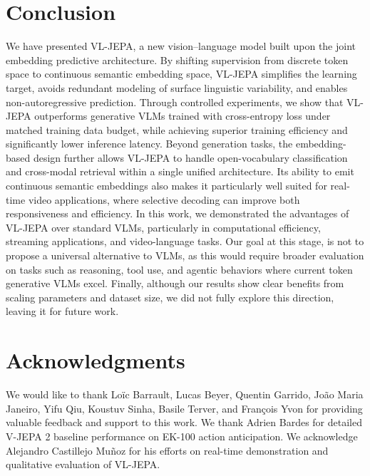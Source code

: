 \section{Conclusion}
\label{sec:conclusion}

We have presented VL-JEPA, a new vision–language model built upon the joint embedding predictive architecture. By shifting supervision from discrete token space to continuous semantic embedding space, VL-JEPA simplifies the learning target, avoids redundant modeling of surface linguistic variability, and enables non-autoregressive prediction. Through controlled experiments, we show that VL-JEPA outperforms generative VLMs trained with cross-entropy loss under matched training data budget, while achieving superior training efficiency and significantly lower inference latency. Beyond generation tasks, the embedding-based design further allows VL-JEPA to handle open-vocabulary classification and cross-modal retrieval within a single unified architecture. Its ability to emit continuous semantic embeddings also makes it particularly well suited for real-time video applications, where selective decoding can improve both responsiveness and efficiency. 
% 
In this work, we demonstrated the advantages of VL-JEPA over standard VLMs, particularly in computational efficiency, streaming applications, and video-language tasks. Our goal at this stage, is not to propose a universal alternative to VLMs, as this would require broader evaluation on tasks such as reasoning, tool use, and agentic behaviors where current token generative VLMs excel. Finally, although our results show clear benefits from scaling parameters and dataset size, we did not fully explore this direction, leaving it for future work.


\section*{Acknowledgments}

We would like to thank Loïc Barrault, Lucas Beyer, Quentin Garrido, João Maria Janeiro, Yifu Qiu, Koustuv Sinha, Basile Terver, and François Yvon for providing valuable feedback and support to this work. We thank Adrien Bardes for detailed V-JEPA 2 baseline performance on EK-100 action anticipation. We acknowledge Alejandro Castillejo Muñoz for his efforts on real-time demonstration and qualitative evaluation of VL-JEPA.